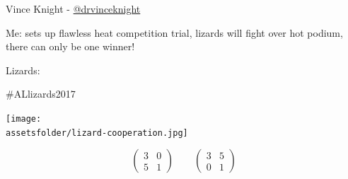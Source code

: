 \documentclass{beamer}
\newcommand{\assetsfolder}{./assets}
\begin{document}
    \begin{frame}
        \begin{center}
            \Huge
               Vince Knight - \href{https://twitter.com/drvinceknight}{@drvinceknight}\\
        \end{center}
    \end{frame}

    \begin{frame}
        \begin{center}
            \begin{tcolorbox}[colback=twitter,colframe=twitter!40!black,title=
                    \href{https://twitter.com/kirstyjean/status/870415613746962432}
                    {@kirstyjean} (2 Jun 2017):
]
                    Me: sets up flawless heat competition trial, lizards will
                    fight over hot podium, there can only be one winner!

                    Lizards:

                    \#ALlizards2017
           \end{tcolorbox}
        \end{center}
        \begin{center}
            \pause
            \texttt{[image: \\assetsfolder/lizard-cooperation.jpg]}
        \end{center}

    \end{frame}

    \begin{frame}
        \Huge
        \[
            \begin{pmatrix}
                3 & 0\\
                5 & 1
            \end{pmatrix}
            \qquad
            \begin{pmatrix}
                3 & 5\\
                0 & 1
            \end{pmatrix}
        \]
    \end{frame}
\end{document}
